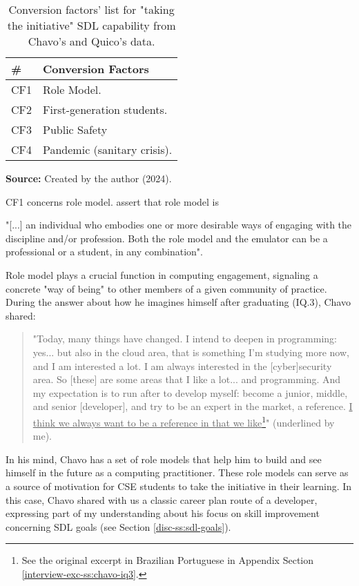 \begin{table}[ht]
\caption{Conversion factors' list for "taking the initiative" \acrshort{SDL} capability from Chavo's and Quico's data.}
\label{tbl:conv-fac-list}
\centering
{}
\begin{tabular}{p{0.8cm}p{5.5cm}}
\hline
\textbf{\#} &
\textbf{Conversion Factors}\\
\hline     
CF1 &
Role Model.\\
CF2 & 
First-generation students. \\
CF3 &
Public Safety \\
CF4 &
Pandemic (sanitary crisis).\\
\hline

\end{tabular}
\par\medskip\ABNTEXfontereduzida\selectfont\textbf{Source:} Created by the author (2024). \par\medskip
\end{table}

\acrshort{CF}1 concerns role model.  assert that role model is
\begin{citacao}
    "[...] an individual who embodies one or more desirable ways of engaging with the discipline and/or profession. Both the role model and the emulator can be a professional or a student, in any combination".
\end{citacao}
Role model plays a crucial function in computing engagement, signaling a concrete "way of being" to other members of a given community of practice. During the answer about how he imagines himself after graduating (\acrshort{IQ}.3), Chavo shared:
\begin{quote}
    "Today, many things have changed. I intend to deepen in programming: yes... but also in the cloud area, that is something I'm studying more now, and I am interested a lot. I am always interested in the [cyber]security area. So [these] are some areas that I like a lot... and programming. And my expectation is to run after to develop myself: become a junior, middle, and senior [developer], and try to be an expert in the market, a reference. \underline{I think we always want to be a reference in that we like}\footnote{See the original excerpt in Brazilian Portuguese in Appendix Section \ref{interview-exc-ss:chavo-iq3}.}" (underlined by me).
\end{quote}
In his mind, Chavo has a set of role models that help him to build and see himself in the future as a computing practitioner. These role models can serve as a source of motivation for \gls{CSE} students to take the initiative in their learning. In this case, Chavo shared with us a classic career plan route of a developer, expressing part of my understanding about his focus on skill improvement concerning \gls{SDL} goals (see Section \ref{disc-ss:sdl-goals}).

